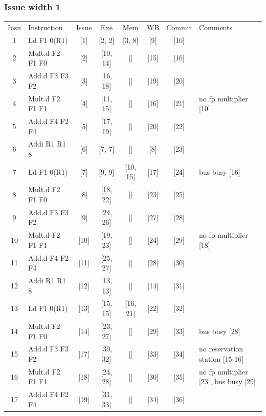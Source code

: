 \documentclass[11pt]{article}
\begin{document}
\subsubsection*{Issue width 1}
\begin{center}
\scriptsize
\setlength{\tabcolsep}{8pt}
\renewcommand{\arraystretch}{1.35}
\begin{tabular}{clccccc>{\raggedright\arraybackslash}p{1.4in}}
Insn & Instruction & Issue & Exe & Mem & WB & Commit & Comments \\
1 & Ld F1 0(R1) & [1] & [2, 2] & [3, 8] & [9] & [10] &  \\
2 & Mult.d F2 F1 F0 & [2] & [10, 14] & [] & [15] & [16] &  \\
3 & Add.d F3 F3 F2 & [3] & [16, 18] & [] & [19] & [20] &  \\
4 & Mult.d F2 F1 F1 & [4] & [11, 15] & [] & [16] & [21] & no fp multiplier [10] \\
5 & Add.d F4 F2 F4 & [5] & [17, 19] & [] & [20] & [22] &  \\
6 & Addi R1 R1 8 & [6] & [7, 7] & [] & [8] & [23] &  \\
7 & Ld F1 0(R1) & [7] & [9, 9] & [10, 15] & [17] & [24] & bus busy [16] \\
8 & Mult.d F2 F1 F0 & [8] & [18, 22] & [] & [23] & [25] &  \\
9 & Add.d F3 F3 F2 & [9] & [24, 26] & [] & [27] & [28] &  \\
10 & Mult.d F2 F1 F1 & [10] & [19, 23] & [] & [24] & [29] & no fp multiplier [18] \\
11 & Add.d F4 F2 F4 & [11] & [25, 27] & [] & [28] & [30] &  \\
12 & Addi R1 R1 8 & [12] & [13, 13] & [] & [14] & [31] &  \\
13 & Ld F1 0(R1) & [13] & [15, 15] & [16, 21] & [22] & [32] &  \\
14 & Mult.d F2 F1 F0 & [14] & [23, 27] & [] & [29] & [33] & bus busy [28] \\
15 & Add.d F3 F3 F2 & [17] & [30, 32] & [] & [33] & [34] & no reservation station [15-16] \\
16 & Mult.d F2 F1 F1 & [18] & [24, 28] & [] & [30] & [35] & no fp multiplier [23], bus busy [29] \\
17 & Add.d F4 F2 F4 & [19] & [31, 33] & [] & [34] & [36] &  \\
\end{tabular}
\end{center}
\end{document}

